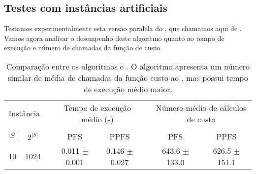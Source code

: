 \subsection{Testes com instâncias artificiais}
Testamos experimentalmente esta versão paralela do , que chamamos aqui de
. Vamos agora analisar o desempenho 
deste algoritmo quanto ao tempo de execução e número de chamadas da 
função de custo.

\begin{table}
\centering
\footnotesize
\caption{Comparação entre os algoritmos  e .
O algoritmo  apresenta um número similar de média de 
chamadas da função custo ao , mas possui tempo de execução 
médio maior.}
\label{tab:ppfs_vs_pfs}
\begin{tabular}{cc c cc c cc}
\toprule
\multicolumn{2}{c}{Instância} & \phantom{} & \multicolumn{2}{c}{Tempo de execução médio (s)} & \phantom{} & \multicolumn{2}{c}{Número médio de cálculos de custo} \\
\cline{1-2}\cline{4-5}\cline{7-8}\\
$|S|$ & $2^{|S|}$ && PFS & PPFS && PFS & PPFS \\
10 &    1024 && 0.011 $\pm$ 0.001 & 0.146 $\pm$ 0.027 && 643.6 $\pm$ 133.0 & 626.5 $\pm$ 151.1 \\

\end{tabular}
\end{table}
